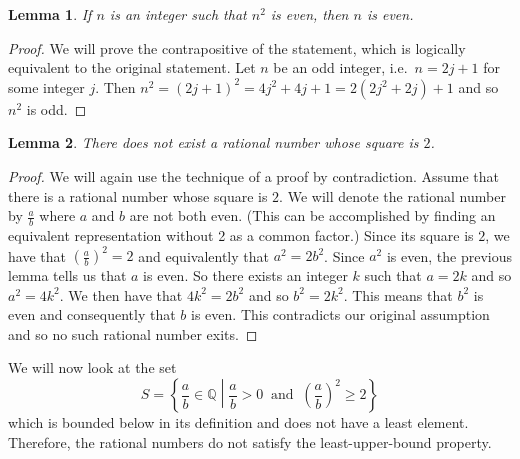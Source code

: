 \documentclass[
]{book}
\newtheorem{lemma}{Lemma}[chapter]
\theoremstyle{definition}
\theoremstyle{definition}
\theoremstyle{definition}
\theoremstyle{remark}
\begin{document}
\begin{lemma}
\protect\hypertarget{lem:unnamed-chunk-108}{}{\label{lem:unnamed-chunk-108} }If \(n\) is an integer such that \(n^2\) is even, then \(n\) is even.
\end{lemma}

\begin{proof}
{}We will prove the contrapositive of the statement, which is logically equivalent to the original statement. Let \(n\) be an odd integer, i.e.~\(n=2j+1\) for some integer \(j\). Then \(n^2=(2j+1)^2=4j^2+4j+1=2(2j^2+2j)+1\) and so \(n^2\) is odd.
\end{proof}

\begin{lemma}
\protect\hypertarget{lem:unnamed-chunk-110}{}{\label{lem:unnamed-chunk-110} }There does not exist a rational number whose square is \(2\).
\end{lemma}

\begin{proof}
{}We will again use the technique of a proof by contradiction. Assume that there is a rational number whose square is \(2\). We will denote the rational number by \(\frac{a}{b}\) where \(a\) and \(b\) are not both even. (This can be accomplished by finding an equivalent representation without 2 as a common factor.) Since its square is \(2\), we have that \(\left(\frac{a}{b}\right)^2 =2\) and equivalently that \(a^2 = 2 b^2\). Since \(a^2\) is even, the previous lemma tells us that \(a\) is even. So there exists an integer \(k\) such that \(a=2k\) and so \(a^2=4k^2\). We then have that \(4k^2=2b^2\) and so \(b^2=2k^2\). This means that \(b^2\) is even and consequently that \(b\) is even. This contradicts our original assumption and so no such rational number exits.
\end{proof}

We will now look at the set
\[S = \left\{ \frac{a}{b}\in \mathbb{Q} \middle \vert \frac{a}{b} >0 \: \mbox{ and } \: \left(\frac{a}{b}\right)^2 \geq 2\right\}\] which is bounded below in its definition and does not have a least element. Therefore, the rational numbers do not satisfy the least-upper-bound property.
\end{document}
